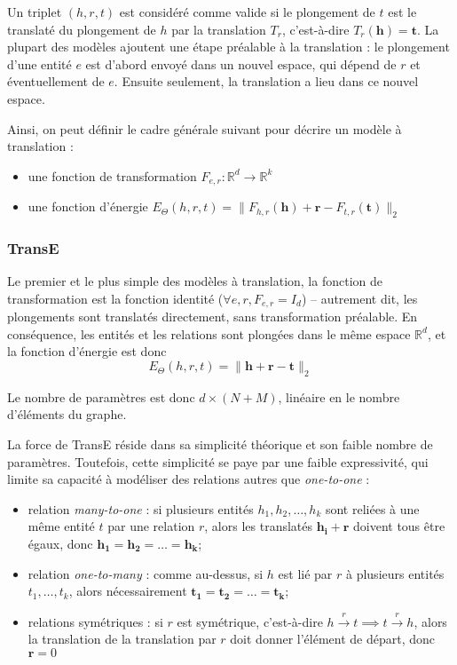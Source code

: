 Un triplet $(h, r, t)$ est considéré comme valide si le plongement de $t$ est le translaté du plongement de $h$ par la translation $T_r$, c'est-à-dire $T_r(\mathbf{h}) = \mathbf{t}$. La plupart des modèles ajoutent une étape préalable à la translation : le plongement d'une entité $e$ est d'abord envoyé dans un nouvel espace, qui dépend de $r$ et éventuellement de $e$. Ensuite seulement, la translation a lieu dans ce nouvel espace.

Ainsi, on peut définir le cadre générale suivant pour décrire un modèle à translation :
\begin{itemize}
    \item une fonction de transformation $F_{e, r} : \mathbb{R}^d \rightarrow \mathbb{R}^{k}$
    \item une fonction d'énergie $E_\Theta(h, r, t) = \| F_{h, r}(\mathbf{h}) + \mathbf{r} - F_{t, r}(\mathbf{t}) \|_2 $
\end{itemize}

\subsubsection{TransE \cite{bordes2013translating}}
Le premier et le plus simple des modèles à translation, la fonction de transformation est la fonction identité ($\forall e, r, F_{e, r} = I_d$) – autrement dit, les plongements sont translatés directement, sans transformation préalable. En conséquence, les entités et les relations sont plongées dans le même espace $\mathbb{R}^d$, et la fonction d'énergie est donc
\begin{equation}
    E_\Theta(h, r, t) = \| \mathbf{h + r - t} \|_2
    \label{eq:transe-main}
\end{equation}

Le nombre de paramètres est donc $d \times (N + M)$, linéaire en le nombre d'éléments du graphe. 

La force de TransE réside dans sa simplicité théorique et son faible nombre de paramètres. Toutefois, cette simplicité se paye par une faible expressivité, qui limite sa capacité à modéliser des relations autres que \textit{one-to-one} :
\begin{itemize}
    \item relation \textit{many-to-one} : si plusieurs entités $h_1, h_2, \ldots, h_k$ sont reliées à une même entité $t$ par une relation $r$, alors les translatés $\mathbf{h_i + r}$ doivent tous être égaux, donc $\mathbf{h_1  = h_2 = \ldots = h_k}$;
    \item relation \textit{one-to-many} : comme au-dessus, si $h$ est lié par $r$ à plusieurs entités $t_1, \ldots, t_k$, alors nécessairement $\mathbf{t_1 = t_2 = \ldots = t_k}$;
    \item relations symétriques : si $r$ est symétrique, c'est-à-dire $h  \overset{r} \rightarrow t \implies t   \overset{r} \rightarrow h$, alors la translation de la translation par $r$ doit donner l'élément de départ, donc $\mathbf{r} = 0$
\end{itemize}

